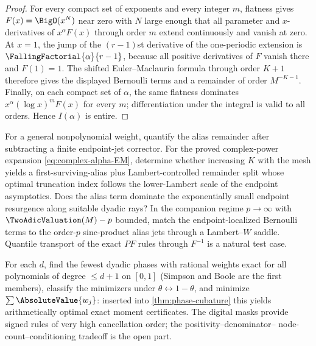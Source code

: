 \begin{proof}
For every compact set of exponents and every integer $m$, flatness gives
$F(x)=\BigO(x^N)$ near zero with $N$ large enough that all parameter and
$x$-derivatives of $x^\alpha F(x)$ through order $m$ extend continuously
and vanish at zero.  At $x=1$, the jump of the $(r-1)$st derivative of
the one-periodic extension is $\FallingFactorial{\alpha}{r-1}$, because all positive
derivatives of $F$ vanish there and $F(1)=1$.  The shifted
Euler--Maclaurin formula through order $K+1$ therefore gives the displayed
Bernoulli terms and a remainder of order $M^{-K-1}$.  Finally, on each
compact set of $\alpha$, the same flatness dominates
$x^\alpha(\log x)^mF(x)$ for every $m$; differentiation under the integral
is valid to all orders.  Hence $I(\alpha)$ is entire.
\end{proof}

\begin{question}
\label{q:analytic-weights}
For a general nonpolynomial weight, quantify the alias remainder after
subtracting a finite endpoint-jet corrector.  For the proved complex-power
expansion \eqref{eq:complex-alpha-EM}, determine whether increasing $K$
with the mesh yields a first-surviving-alias plus Lambert-controlled
remainder split whose optimal truncation index follows the lower-Lambert
scale of the endpoint asymptotics.  Does the alias term dominate the
exponentially small endpoint resurgence along suitable dyadic rays?  In
the companion regime $p\to\infty$ with
$\TwoAdicValuation(M)-p$ bounded, match the endpoint-localized Bernoulli
terms to the order-$p$ sinc-product alias jets through a Lambert--$W$
saddle.  Quantile transport of the exact $PF$ rules through $F^{-1}$ is a
natural test case.
\end{question}

\begin{question}
\label{q:dyadic-phase-support}
For each $d$, find the fewest dyadic phases with rational weights
exact for all polynomials of degree $\le d+1$ on $[0,1]$ (Simpson and
Boole are the first members), classify the minimizers under
$\theta\leftrightarrow1-\theta$, and minimize $\sum\AbsoluteValue{w_j}$:
inserted into \cref{thm:phase-cubature} this yields arithmetically
optimal exact moment certificates.  The digital masks provide signed
rules of very high cancellation order; the positivity--denominator--%
node-count--conditioning tradeoff is the open part.
\end{question}

